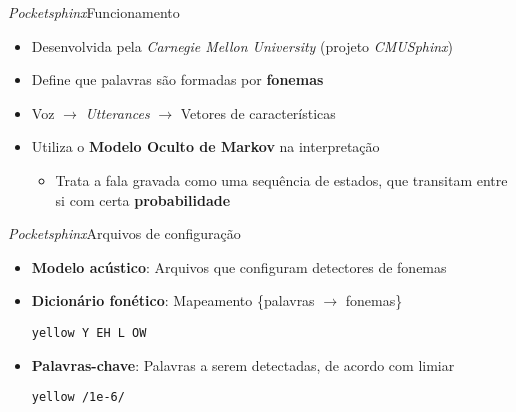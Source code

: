 \begin{frame}{\textit{Pocketsphinx}}{Funcionamento}

\begin{itemize}
\item Desenvolvida pela \textit{Carnegie Mellon University} (projeto \textit{CMUSphinx})

\item Define que palavras são formadas por \textbf{fonemas}

\item<2-> Voz $\rightarrow$ \textit{Utterances} $\rightarrow$ Vetores de características

\item<3-> Utiliza o \textbf{Modelo Oculto de Markov} na interpretação

\begin{itemize}
  \item Trata a fala gravada como uma sequência de estados, que transitam entre si com certa \textbf{probabilidade}
\end{itemize}
\end{itemize}


\end{frame}


\begin{frame}{\textit{Pocketsphinx}}{Arquivos de configuração}

\begin{itemize}
\item \textbf{Modelo acústico}: Arquivos que configuram detectores de fonemas

\item<2-> \textbf{Dicionário fonético}: Mapeamento \{palavras \(\rightarrow\) fonemas\}

\begin{center}
  \color{Maroon}\texttt{yellow Y EH L OW}
\end{center}

\item<3-> \textbf{Palavras-chave}: Palavras a serem detectadas, de acordo com limiar

\begin{center}
  \color{Maroon}\texttt{yellow /1e-6/}
\end{center}

\end{itemize}
\end{frame}

